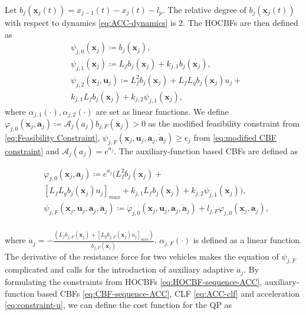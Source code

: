 \documentclass[letterpaper, 10 pt, conference]{ieeeconf}
\theoremstyle{definition}
\begin{document}
Let $b_{j}(\boldsymbol{x}_{j}(t))=x_{j-1}(t)-x_{j}(t)-l_{p}$. The relative degree of $b_{j}(\boldsymbol{x}_{j}(t))$ with respect to dynamics \eqref{eq:ACC-dynamics} is 2. The HOCBFs are then defined as 
\begin{equation}
\label{eq:HOCBF-sequence-ACC}
\begin{split}
&\psi_{j,0}(\boldsymbol{x}_{j})\coloneqq b_{j}(\boldsymbol{x}_{j}),\\
&\psi_{j,1}(\boldsymbol{x}_{j})\coloneqq L_{f}b_{j}(\boldsymbol{x}_{j})+k_{j,1}b_{j}(\boldsymbol{x}_{j}),\\
&\psi_{j,2}(\boldsymbol{x}_{j},\boldsymbol{u}_{j})\coloneqq L_{f}^{2}b_{j}(\boldsymbol{x}_{j})+L_{f}L_{g}b_{j}(\boldsymbol{x}_{j})u_{j}+\\
&k_{j,1}L_{f}b_{j}(\boldsymbol{x}_{j})+k_{j,2}\psi_{j,1}(\boldsymbol{x}_{j}),
\end{split}
\end{equation}
where $\alpha_{j,1}(\cdot),\alpha_{j,2}(\cdot)$ are set as linear functions. We define $\varphi_{j,0}(\boldsymbol{x}_{j},\boldsymbol{a}_{j})\coloneqq \mathcal{A}_{j}(a_{j})b_{j,F}(\boldsymbol{x}_{j})> 0$ as the modified feasibility constraint from \eqref{eq:Feasibility Constraint}, $\psi_{j,F}(\boldsymbol{x}_{j},\boldsymbol{u}_{j},\boldsymbol{a}_{j},\dot{\boldsymbol{a}}_{j})\ge \epsilon_{j}$ from \eqref{eq:modified CBF constraint} and $\mathcal{A}_{j}(a_{j})=e^{a_{j}}.$ The auxiliary-function based CBFs are defined as
\begin{small}
\begin{equation}
\label{eq:CBF-sequence-ACC}
\begin{split}
&\varphi_{j,0}(\boldsymbol{x}_{j},\boldsymbol{a}_{j})\coloneqq e^{a_{j}}(L_{f}^{2}b_{j}(\boldsymbol{x}_{j})+\\
&[L_{f}L_{g}b_{j}(\boldsymbol{x}_{j})u_{j}]_{max}+k_{j,1}L_{f}b_{j}(\boldsymbol{x}_{j})+k_{j,2}\psi_{j,1}(\boldsymbol{x}_{j})),\\
&\psi_{j,F}(\boldsymbol{x}_{j},\boldsymbol{u}_{j},\boldsymbol{a}_{j},\dot{\boldsymbol{a}}_{j})\coloneqq \dot{\varphi}_{j,0}(\boldsymbol{x}_{j},\boldsymbol{u}_{j},\boldsymbol{a}_{j},\dot{\boldsymbol{a}}_{j})+l_{j,F}\varphi_{j,0}(\boldsymbol{x}_{j},\boldsymbol{a}_{j}),\\
\end{split}
\end{equation}
\end{small}
where $\dot{a}_{j}=-\frac{(L_{f}b_{j,F}(\boldsymbol{x}_{j})+[L_{g}b_{j,F}(\boldsymbol{x}_{j})u_{j}]_{min})}{b_{j,F}(\boldsymbol{x}_{j})}.$ $\alpha_{j,F}(\cdot)$ is defined as a linear function. The derivative of the resistance force for two vehicles makes the equation of $\psi_{j,F}$ complicated and calls for the introduction of auxiliary adaptive $\dot{a}_{j}$. By formulating the constraints from HOCBFs \eqref{eq:HOCBF-sequence-ACC}, auxiliary-function based CBFs \eqref{eq:CBF-sequence-ACC}, CLF \eqref{eq:ACC-clf} and acceleration \eqref{eq:constraint-u}, we can define the cost function for the QP as
\end{document}
